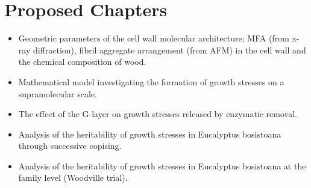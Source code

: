 \chapter{Proposed Chapters}
\begin{itemize}
\item Geometric parameters of the cell wall molecular architecture; MFA (from x-ray
diffraction), fibril aggregate arrangement (from AFM) in the  cell wall and the
chemical composition of wood.
\end{itemize}

\begin{itemize}
\item Mathematical model investigating the formation of growth stresses on a
supramolecular scale.
\end{itemize}

\begin{itemize}
\item The effect of the G-layer on growth stresses released by enzymatic removal.
\end{itemize}
\begin{itemize}
\item Analysis of the heritability of growth stresses in Eucalyptus bosistoana through
successive copising.
\end{itemize}

\begin{itemize}
\item Analysis of the heritability of growth stresses in Eucalyptus bosistoana at the
family level (Woodville trial).
\end{itemize}
